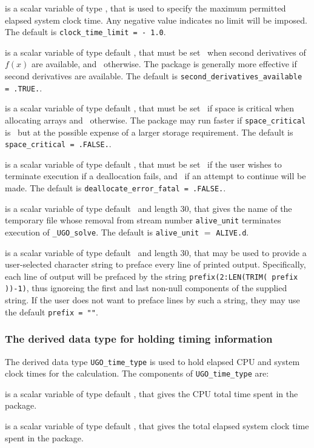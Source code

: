 \documentclass{galahad}
\newcommand{\packagename}{UGO}
\newcommand{\fullpackagename}{\libraryname\_\packagename}
\newcommand{\solver}{{\tt \fullpackagename\_solve}}
\begin{document}
\begin{description}
 is a scalar variable of type \realdp,
that is used to specify the maximum permitted elapsed system clock time.
Any negative value indicates no limit will be imposed. The default is
{\tt clock\_time\_limit = - 1.0}.

 is a scalar variable of type default 
\logical, that must be set \true\ when second derivatives of $f(x)$ 
are available, and  \false\ otherwise. The package is generally more effective 
if second derivatives are available.
The default is {\tt second\_derivatives\_available = .TRUE.}.

 is a scalar variable of type default \logical,
that must be set \true\ if space is critical when allocating arrays
and  \false\ otherwise. The package may run faster if
{\tt space\_critical} is \false\ but at the possible expense of a larger
storage requirement. The default is {\tt space\_critical = .FALSE.}.

 is a scalar variable of type default \logical,
that must be set \true\ if the user wishes to terminate execution if
a deallocation  fails, and \false\ if an attempt to continue
will be made. The default is {\tt deallocate\_error\_fatal = .FALSE.}.

 is a scalar variable of type default \character\ and length
30, that gives the name of the temporary file whose removal from stream number
{\tt alive\_unit} terminates execution of \solver.
The default is {\tt alive\_unit} $=$ {\tt ALIVE.d}.

 is a scalar variable of type default \character\
and length 30, that may be used to provide a user-selected
character string to preface every line of printed output.
Specifically, each line of output will be prefaced by the string
{\tt prefix(2:LEN(TRIM( prefix ))-1)},
thus ignoreing the first and last non-null components of the
supplied string. If the user does not want to preface lines by such
a string, they may use the default {\tt prefix = ""}.

\end{description}


\subsubsection{The derived data type for holding timing
 information}\label{typetime}
The derived data type
{\tt \packagename\_time\_type}
is used to hold elapsed CPU and system clock times for the calculation.
The components of
{\tt \packagename\_time\_type}
are:
\begin{description}
 is a scalar variable of type default \real, that gives
 the CPU total time spent in the package.

 is a scalar variable of type default \real, that gives
 the total elapsed system clock time spent in the package.

\end{description}
\end{document}
